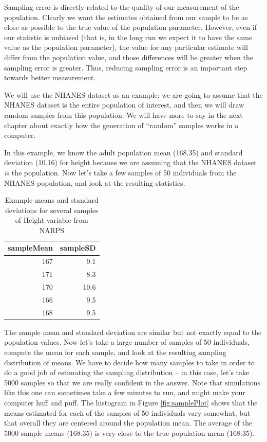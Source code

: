 \documentclass[12pt,]{book}
\theoremstyle{definition}
\theoremstyle{definition}
\theoremstyle{definition}
\theoremstyle{remark}
\begin{document}
Sampling error is directly related to the quality of our measurement of the population. Clearly we want the estimates obtained from our sample to be as close as possible to the true value of the population parameter. However, even if our statistic is unbiased (that is, in the long run we expect it to have the same value as the population parameter), the value for any particular estimate will differ from the population value, and those differences will be greater when the sampling error is greater. Thus, reducing sampling error is an important step towards better measurement.

We will use the NHANES dataset as an example; we are going to assume that the NHANES dataset is the entire population of interest, and then we will draw random samples from this population. We will have more to say in the next chapter about exactly how the generation of ``random'' samples works in a computer.

In this example, we know the adult population mean (168.35) and standard deviation (10.16) for height because we are assuming that the NHANES dataset \emph{is} the population. Now let's take a few samples of 50 individuals from the NHANES population, and look at the resulting statistics.

\begin{table}

\caption{\label{tab:unnamed-chunk-33}Example means and standard deviations for several samples of Height variable from NARPS}
\centering
\begin{tabular}[t]{r|r}
\hline
sampleMean & sampleSD\\
\hline
167 & 9.1\\
\hline
171 & 8.3\\
\hline
170 & 10.6\\
\hline
166 & 9.5\\
\hline
168 & 9.5\\
\hline
\end{tabular}
\end{table}

The sample mean and standard deviation are similar but not exactly equal to the population values. Now let's take a large number of samples of 50 individuals, compute the mean for each sample, and look at the resulting sampling distribution of means. We have to decide how many samples to take in order to do a good job of estimating the sampling distribution -- in this case, let's take 5000 samples so that we are really confident in the answer. Note that simulations like this one can sometimes take a few minutes to run, and might make your computer huff and puff. The histogram in Figure \ref{fig:samplePlot} shows that the means estimated for each of the samples of 50 individuals vary somewhat, but that overall they are centered around the population mean. The average of the 5000 sample means (168.35) is very close to the true population mean (168.35).
\end{document}

